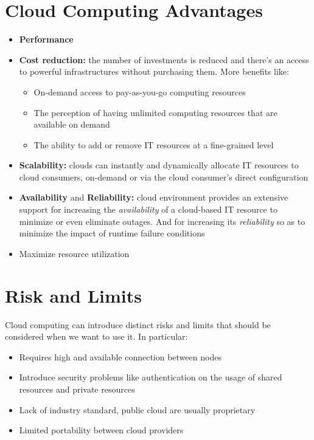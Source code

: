 \section{Cloud Computing Advantages}
\begin{itemize}
    \item \textbf{Performance}
    \item \textbf{Cost reduction:} the number of investments is reduced and there’s an access to powerful infrastructures without purchasing them. More benefits like:
    \begin{itemize}
        \item On-demand access to pay-as-you-go computing resources
        \item The perception of having unlimited computing resources that are available on demand
        \item The ability to add or remove IT resources at a fine-grained level
    \end{itemize}
    \item \textbf{Scalability:} clouds can instantly and dynamically allocate IT resources to cloud consumers, on-demand or via the cloud consumer’s direct configuration
    \item \textbf{Availability} and \textbf{Reliability:} cloud environment provides an extensive support for increasing the \textit{availability} of a cloud-based IT resource to minimize or even eliminate outages. And for increasing its \textit{reliability} so as to minimize the impact of runtime failure conditions
    \item Maximize resource utilization
\end{itemize}  

\section{Risk and Limits}
Cloud computing can introduce distinct risks and limits that should be considered when we want to use it. In particular:
\begin{itemize}
    \item Requires high and available connection between nodes
    \item Introduce security problems like authentication on the usage of shared resources and private resources
    \item Lack of industry standard, public cloud are usually proprietary
    \item Limited portability between cloud providers
\end{itemize}


